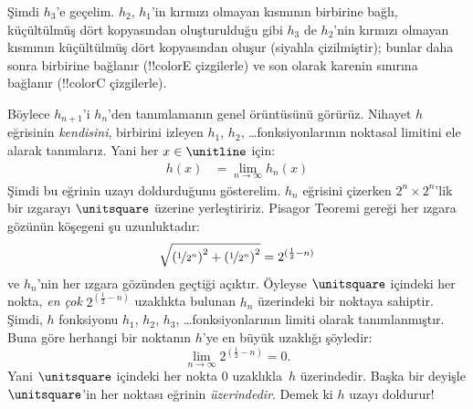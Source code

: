 Şimdi $h_3$'e geçelim. $h_2$, $h_1$'in kırmızı olmayan kısmının birbirine
bağlı, küçültülmüş dört kopyasından oluşturulduğu gibi $h_3$ de $h_2$'nin
kırmızı olmayan kısmının küçültülmüş dört kopyasından oluşur (siyahla
çizilmiştir); bunlar daha sonra birbirine bağlanır (!!{colorE} çizgilerle) ve
son olarak karenin sınırına bağlanır (!!{colorC} çizgilerle).
\begin{center}
\end{center}
Böylece $h_{n+1}$'i $h_n$'den tanımlamanın genel örüntüsünü görürüz.
Nihayet $h$ eğrisinin \emph{kendisini}, birbirini izleyen $h_1$, $h_2$,
\dots\@ fonksiyonlarının noktasal limitini ele alarak tanımlarız. Yani her
$x \in \unitline$ için:
\begin{align*}
	h(x) &= \lim_{n \rightarrow \infty} h_n(x)
\end{align*} 
Şimdi bu eğrinin uzayı doldurduğunu gösterelim. $h_n$ eğrisini çizerken
$2^n \times 2^n$'lik bir ızgarayı $\unitsquare$ üzerine yerleştiririz.
Pisagor Teoremi gereği her ızgara gözünün köşegeni şu uzunluktadır:
\[
\sqrt{\left(\nicefrac{1}{2^{n}}\right)^2+\left(\nicefrac{1}{2^{n}}\right)^2} = 2^{(\frac{1}{2}-n)}
\]
ve $h_n$'nin her ızgara gözünden geçtiği açıktır. Öyleyse $\unitsquare$
içindeki her nokta, \emph{en çok} $2^{(\frac{1}{2}-n)}$ uzaklıkta bulunan
$h_n$ üzerindeki bir noktaya sahiptir. Şimdi, $h$ fonksiyonu $h_1$, $h_2$, $h_3$,
\dots\@ fonksiyonlarının limiti olarak tanımlanmıştır. Buna göre herhangi bir
noktanın $h$'ye en büyük uzaklığı şöyledir:
\[
\lim_{n \rightarrow \infty} 2^{(\frac{1}{2}-n)} = 0.
\]
Yani $\unitsquare$ içindeki her nokta $0$ uzaklıkla~$h$ üzerindedir. Başka bir
deyişle $\unitsquare$'in her noktası eğrinin \emph{üzerindedir}. Demek ki $h$
uzayı doldurur!{}

